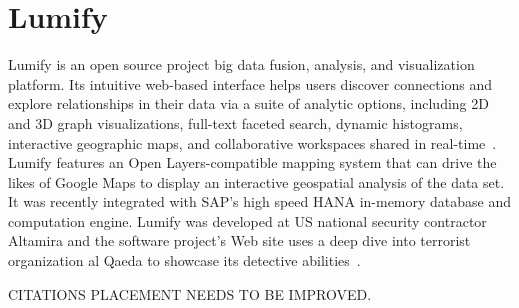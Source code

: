 \section{Lumify}
Lumify is an open source project big data fusion, analysis, and visualization
platform. Its intuitive web-based interface helps users discover connections
and explore relationships in their data via a suite of analytic options,
including 2D and 3D graph visualizations, full-text faceted search, dynamic
histograms, interactive geographic maps, and collaborative workspaces shared in
real-time~\cite{lumify-web}. Lumify features an Open Layers-compatible mapping
system that can drive the likes of Google Maps to display an interactive
geospatial analysis of the data set. It was recently integrated with SAP's
high speed HANA in-memory database and computation engine. Lumify was developed
at US national security contractor Altamira and the software project's Web
site uses a deep dive into terrorist organization al Qaeda to showcase its
detective abilities~\cite{lumify-linkedin}.
 
CITATIONS PLACEMENT NEEDS TO BE IMPROVED.
